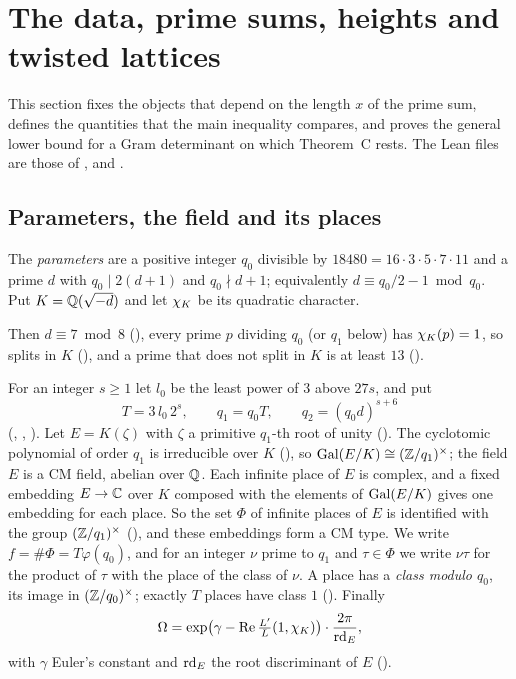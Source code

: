 \section{The data, prime sums, heights and twisted lattices}\label{sec:setup}

This section fixes the objects that depend on the length $x$ of the prime sum, defines the
quantities that the main inequality compares, and proves the general lower bound for a Gram
determinant on which Theorem~C rests. The Lean files are those of
,  and
.

\subsection{Parameters, the field and its places}

\begin{definition}\label{setup:def:parameters}
The \emph{parameters} are a positive integer $q_0$ divisible by $18480 = 16\cdot3\cdot5\cdot7\cdot11$
and a prime $d$ with $q_0 \mid 2(d+1)$ and $q_0 \nmid d+1$; equivalently
$d \equiv q_0/2 - 1 \bmod q_0$. Put $K = \mathbb{Q}(\sqrt{-d})$ and let $\chi_K$ be its quadratic
character.
\end{definition}

Then $d \equiv 7 \bmod 8$ (), every prime $p$ dividing
$q_0$ (or $q_1$ below) has $\chi_K(p) = 1$, so splits in $K$
(), and a prime that does not split in $K$ is at least
$13$ ().

For an integer $s \ge 1$ let $l_0$ be the least power of $3$ above $27s$, and put
\[
  T = 3\, l_0\, 2^s, \qquad q_1 = q_0 T, \qquad q_2 = (q_0 d)^{s+6}
\]
(, , ). Let $E = K(\zeta)$ with
$\zeta$ a primitive $q_1$-th root of unity (). The cyclotomic polynomial of
order $q_1$ is irreducible over $K$ (), so
$\operatorname{Gal}(E/K) \cong (\mathbb{Z}/q_1)^\times$; the field $E$ is a CM field, abelian over $\mathbb{Q}$. Each infinite
place of $E$ is complex, and a fixed embedding $E \to \mathbb{C}$ over $K$ composed with the elements of
$\operatorname{Gal}(E/K)$ gives one embedding for each place. So the set $\Phi$ of infinite places of $E$ is
identified with the group $(\mathbb{Z}/q_1)^\times$ (), and these
embeddings form a CM type. We write $f = \#\Phi = T\varphi(q_0)$, and for an integer $\nu$ prime to
$q_1$ and $\tau \in \Phi$ we write $\nu\tau$ for the product of $\tau$ with the place of the class
of $\nu$. A place has a \emph{class modulo $q_0$}, its image in $(\mathbb{Z}/q_0)^\times$; exactly $T$
places have class $1$ (). Finally
\[
  \Omega = \exp\bigl(\gamma - \operatorname{Re} \tfrac{L'}{L}(1,\chi_K)\bigr)\cdot \frac{2\pi}{\mathrm{rd}_E},
\]
with $\gamma$ Euler's constant and $\mathrm{rd}_E$ the root discriminant of $E$
().

